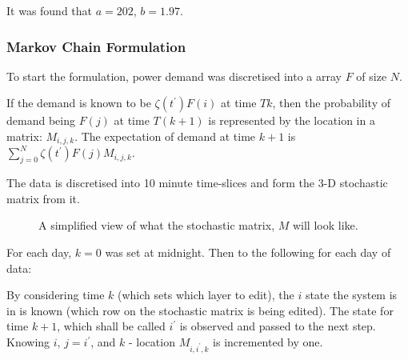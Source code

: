 It was found that $a = 202$, $b = 1.97$.

\subsubsection{Markov Chain Formulation}

To start the formulation, power demand was discretised into a array $F$ of size $N$.

If the demand is known to be $\zeta(t^{\prime}) F(i)$ at time $Tk$, then the probability of demand being $F(j)$ at time $T(k+1)$ is represented by the location in a matrix: $M_{i,j,k}$.
The expectation of demand at time $k+1$ is $\sum^{N}_{j=0} \zeta(t^{\prime}) F(j) M_{i,j,k}$. 

The data is discretised into 10 minute time-slices and form the 3-D stochastic matrix from it.

\begin{figure}[bht]
        \centering
\usetikzlibrary{arrows}
        \caption{A simplified view of what the stochastic matrix, $M$ will look like.} \label{fig:markov}
\end{figure}
For each day, $k=0$ was set at midnight.
Then to the following for each day of data:

By considering time $k$ (which sets which layer to edit), the $i$ state the system is in is known (which row on the stochastic matrix is being edited).
The state for time $k+1$, which shall be called $i^\prime$ is observed and passed to the next step.
Knowing $i$, $j = i^\prime$, and $k$ - location $M_{i,i^\prime,k}$ is incremented by one.

